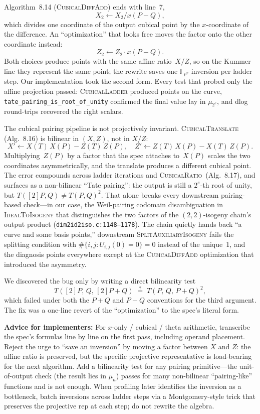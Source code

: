 Algorithm~8.14 (\textsc{CubicalDiffAdd}) ends with line~7,
\[
  X_2 \gets X_2 / x(P{-}Q),
\]
which divides one coordinate of the output cubical point by the
$x$-coordinate of the difference.  An ``optimization'' that looks
free moves the factor onto the other coordinate instead:
\[
  Z_2 \gets Z_2 \cdot x(P{-}Q).
\]
Both choices produce points with the same affine
ratio~$X/Z$, so on the Kummer line they represent the same point;
the rewrite saves one $\mathbb{F}_{p^2}$ inversion per ladder step.
Our implementation took the second form.  Every test that probed
only the affine projection passed: \textsc{CubicalLadder} produced
points on the curve, \texttt{tate\_pairing\_is\_root\_of\_unity}
confirmed the final value lay in $\mu_{2^e}$, and dlog round-trips
recovered the right scalars.

The cubical pairing pipeline is not projectively invariant.
\textsc{CubicalTranslate} (Alg.~8.16) is bilinear in $(X, Z)$, not
in $X/Z$:
\[
  X' \gets X(T)\,X(P) - Z(T)\,Z(P), \quad
  Z' \gets Z(T)\,X(P) - X(T)\,Z(P).
\]
Multiplying~$Z(P)$ by a factor that the spec attaches to~$X(P)$
scales the two coordinates asymmetrically, and the translate
produces a different cubical point.  The error compounds across
ladder iterations and \textsc{CubicalRatio}~(Alg.~8.17), and
surfaces as a non-bilinear ``Tate pairing'': the output is still a
$2^e$-th root of unity, but $T([2]P, Q) \neq T(P, Q)^2$.  That
alone breaks every downstream pairing-based check---in our case,
the Weil-pairing codomain disambiguation in
\textsc{IdealToIsogeny} that distinguishes the two factors of the
$(2,2)$-isogeny chain's output product
(\texttt{dim2id2iso.c:1148--1178}).  The chain quietly hands back
``a curve and some basis points,'' downstream
\textsc{SplitAuxiliaryIsogeny} fails the splitting condition with
$\#\{i,j : U_{i,j}(0) = 0\} = 0$ instead of the unique~$1$, and
the diagnosis points everywhere except at the
\textsc{CubicalDiffAdd} optimization that introduced the asymmetry.

We discovered the bug only by writing a direct bilinearity test
\[
  T([2]P,\,Q,\,[2]P{+}Q) \;\stackrel{?}{=}\; T(P,\,Q,\,P{+}Q)^2,
\]
which failed under both the $P{+}Q$ and $P{-}Q$ conventions for
the third argument.  The fix was a one-line revert of the
``optimization'' to the spec's literal form.

\noindent
\textbf{Advice for implementers:} For
$x$-only / cubical / theta arithmetic, transcribe the spec's
formulas line by line on the first pass, including operand
placement.  Reject the urge to ``save an inversion'' by moving a
factor between $X$ and $Z$: the affine ratio is preserved, but the
specific projective representative is load-bearing for the next
algorithm.  Add a bilinearity test for any pairing primitive---the
unit-of-output check (the result lies in $\mu_n$) passes for many
non-bilinear ``pairing-like'' functions and is not enough.  When
profiling later identifies the inversion as a bottleneck, batch
inversions across ladder steps via a Montgomery-style trick that
preserves the projective rep at each step; do not rewrite the
algebra.

